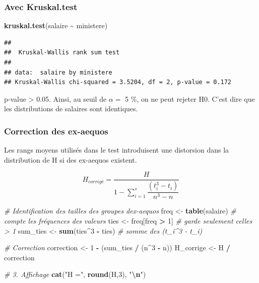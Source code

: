 \documentclass[
  12pt,
]{article}
\newenvironment{Shaded}{\begin{snugshade}}{\end{snugshade}}
\newcommand{\CommentTok}[1]{\textcolor[rgb]{0.56,0.35,0.01}{\textit{#1}}}
\newcommand{\DecValTok}[1]{\textcolor[rgb]{0.00,0.00,0.81}{#1}}
\newcommand{\FunctionTok}[1]{\textcolor[rgb]{0.13,0.29,0.53}{\textbf{#1}}}
\newcommand{\NormalTok}[1]{#1}
\newcommand{\OtherTok}[1]{\textcolor[rgb]{0.56,0.35,0.01}{#1}}
\newcommand{\SpecialCharTok}[1]{\textcolor[rgb]{0.81,0.36,0.00}{\textbf{#1}}}
\newcommand{\StringTok}[1]{\textcolor[rgb]{0.31,0.60,0.02}{#1}}
\begin{document}
\subsubsection{Avec Kruskal.test}\label{avec-kruskal.test}

\begin{Shaded}
\begin{Highlighting}[]
\FunctionTok{kruskal.test}\NormalTok{(salaire }\SpecialCharTok{\textasciitilde{}}\NormalTok{ ministere)}
\end{Highlighting}
\end{Shaded}

\begin{verbatim}
## 
##  Kruskal-Wallis rank sum test
## 
## data:  salaire by ministere
## Kruskal-Wallis chi-squared = 3.5204, df = 2, p-value = 0.172
\end{verbatim}

p-value \textgreater{} 0.05. Ainsi, au seuil de \(\alpha =\) 5 \%, on ne
peut rejeter H0. C'est dire que les distributions de salaires sont
identiques.

\subsubsection{Correction des ex-aequos}\label{correction-des-ex-aequos}

Les rangs moyens utilisés dans le test introduisent une distorsion dans
la distribution de H si des ex-aequos existent.

\[ H_{corrigé} = \dfrac{H}{1- \sum_{i=1}^s \dfrac{(t_i^3 - t_i)}{n^3 - n}} \]

\begin{Shaded}
\begin{Highlighting}[]
\CommentTok{\# Identification des tailles des groupes d\textquotesingle{}ex{-}aequos}
\NormalTok{freq }\OtherTok{\textless{}{-}} \FunctionTok{table}\NormalTok{(salaire)          }\CommentTok{\# compte les fréquences des valeurs}
\NormalTok{ties }\OtherTok{\textless{}{-}}\NormalTok{ freq[freq }\SpecialCharTok{\textgreater{}} \DecValTok{1}\NormalTok{]          }\CommentTok{\# garde seulement celles \textgreater{} 1}
\NormalTok{sum\_ties }\OtherTok{\textless{}{-}} \FunctionTok{sum}\NormalTok{(ties}\SpecialCharTok{\^{}}\DecValTok{3} \SpecialCharTok{{-}}\NormalTok{ ties)  }\CommentTok{\# somme des (t\_i\^{}3 {-} t\_i)}

\CommentTok{\# Correction}
\NormalTok{correction }\OtherTok{\textless{}{-}} \DecValTok{1} \SpecialCharTok{{-}}\NormalTok{ (sum\_ties }\SpecialCharTok{/}\NormalTok{ (n}\SpecialCharTok{\^{}}\DecValTok{3} \SpecialCharTok{{-}}\NormalTok{ n))}
\NormalTok{H\_corrige }\OtherTok{\textless{}{-}}\NormalTok{ H }\SpecialCharTok{/}\NormalTok{ correction}

\CommentTok{\# 3. Affichage}
\FunctionTok{cat}\NormalTok{(}\StringTok{"H ="}\NormalTok{, }\FunctionTok{round}\NormalTok{(H,}\DecValTok{3}\NormalTok{), }\StringTok{"}\SpecialCharTok{\textbackslash{}n}\StringTok{"}\NormalTok{)}
\end{Highlighting}
\end{Shaded}
\end{document}
